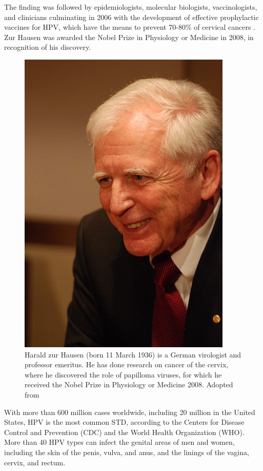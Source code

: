 The finding was followed by epidemiologists, molecular biologists, vaccinologists, and clinicians culminating in 2006 with the development of effective prophylactic vaccines for HPV, which have the means to prevent 70-80\% of cervical cancers \cite{olsen2015revisiting}. Zur Hausen was awarded the Nobel Prize in Physiology or Medicine in 2008, in recognition of his discovery.

\begin{figure}[ht]
	\centering
	\includegraphics[scale=0.7]{IMG/zurHausen.png}
	\caption{Harald zur Hausen (born 11 March 1936) is a German virologist and professor emeritus. He has done research on cancer of the cervix, where he discovered the role of papilloma viruses, for which he received the Nobel Prize in Physiology or Medicine 2008. Adopted from \cite{haraldZur2010}}
	\label{zurHausen}
\end{figure} 

With more than 600 million cases worldwide, including 20 million in the United States, HPV is the most common STD, according to the Centers for Disease Control and Prevention (CDC) and the World Health Organization (WHO). More than 40 HPV types can infect the genital areas of men and women, including the skin of the penis, vulva, and anus, and the linings of the vagina, cervix, and rectum.

